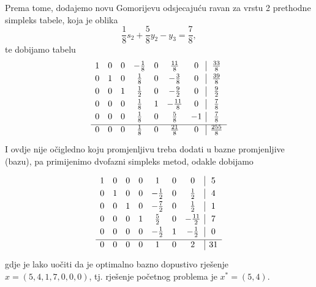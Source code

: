\documentclass[b5paper, utf8, 11pt, colorlinks]{book}
\theoremstyle{definition}
\begin{document}
Prema tome, dodajemo novu Gomorijevu odsjecajuću ravan za vrstu 2 prethodne simpleks tabele, koja je oblika
$$  \frac{1}{8}s_2 + \frac{5}{8} y_2 - y_3 = \frac{7}{8},$$
te dobijamo tabelu
$$ \begin{array}{ccccccc| c}\vspace{1mm}
1    &   0   &   0   &  -\frac{1}{8}   &   0    &    \frac{11}{8}    & 0 & \frac{33}{8} \\\vspace{1mm}
0    &   1   &   0   &   \frac{1}{8}   &   0    &    -\frac{3}{8}    & 0 & \frac{39}{8} \\\vspace{1mm}
0    &   0   &   1   &   \frac{1}{2}   &   0    &    - \frac{9}{2}   & 0 & \frac{9}{2} \\\vspace{1mm}
0    &   0   &   0   &   \frac{1}{8}   &   1    &    - \frac{11}{8}  & 0    & \frac{7}{8} \\ \vspace{1mm}
0    &   0   &   0   &   \frac{1}{8}   &   0    &    \frac{5}{8}     & -1 & \frac{7}{8} \\ \hline\vspace{1mm}
0    &   0   &   0   &   \frac{1}{8}   &   0    &     \frac{21}{8}   & 0 & \frac{255}{8}   
\end{array} $$
I ovdje nije očigledno koju   promjenljivu treba dodati u bazne promjenljive (bazu), pa primijenimo dvofazni simpleks metod, odakle dobijamo 

$$ \begin{array}{ccccccc| c}\vspace{1mm}
    1    &   0   &   0   &  0 &  1  &   0    &    0    & 5  \\\vspace{1mm}
0    &   1   &   0   &  0   &   -\frac{1}{2}    &   0   & \frac{1}{2} & 4 \\\vspace{1mm}
0    &   0   &   1   &  0   &   -\frac{7}{2}    &   0   & \frac{1}{2} & 1 \\\vspace{1mm}
0    &   0   &   0   &  1  &   \frac{5}{2}    &  0 &  -\frac{11}{2}    & 7 \\ \vspace{1mm}
0    &   0   &   0   &   0 &  -\frac{1}{2}    &   1   & - \frac{1}{2} & 0\\ \hline\vspace{1mm}
0    &   0   &   0   &  0  &   1    &    0   & 2 & 31  
\end{array} 
$$
gdje je lako uočiti da je optimalno bazno dopustivo rješenje $x=(5, 4, 1, 7, 0, 0, 0 )$, tj. rješenje početnog problema je $x^*=(5, 4)$.
\end{document}
